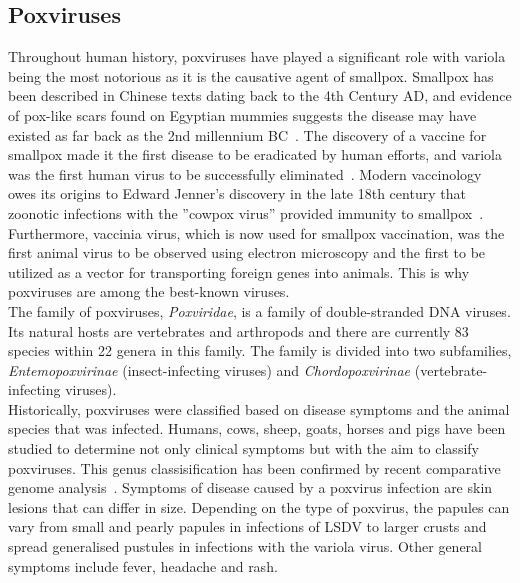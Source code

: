 \subsection{Poxviruses}
Throughout human history, poxviruses have played a significant role with variola being the most notorious as it is the causative agent of smallpox. Smallpox has been described in Chinese texts dating back to the 4th Century AD, and evidence of pox-like scars found on Egyptian mummies suggests the disease may have existed as far back as the 2nd millennium BC~\cite{fenner1988history}. The discovery of a vaccine for smallpox made it the first disease to be eradicated by human efforts, and variola was the first human virus to be successfully eliminated~\cite{fenner2000adventures}. Modern vaccinology owes its origins to Edward Jenner's discovery in the late 18th century that zoonotic infections with the ''cowpox virus'' provided immunity to smallpox~\cite{fenner1988history}. Furthermore, vaccinia virus, which is now used for smallpox vaccination, was the first animal virus to be observed using electron microscopy and the first to be utilized as a vector for transporting foreign genes into animals. This is why poxviruses are among the best-known viruses. \\
The family of poxviruses, \textit{Poxviridae}, is a family of double-stranded \ac{DNA} viruses. Its natural hosts are vertebrates and arthropods and there are currently 83 species within 22 genera in this family. The family is divided into two subfamilies, \textit{Entemopoxvirinae} (insect-infecting viruses) and \textit{Chordopoxvirinae} (vertebrate-infecting viruses). \\
Historically, poxviruses were classified based on disease symptoms and the animal species that was infected. Humans, cows, sheep, goats, horses and pigs have been studied to determine not only clinical symptoms but with the aim to classify poxviruses. This genus classisification has been confirmed by recent comparative genome analysis~\cite{gubser2004poxvirus}. Symptoms of disease caused by a poxvirus infection are skin lesions that can differ in size. Depending on the type of poxvirus, the papules can vary from small and pearly papules in infections of \ac{LSDV} to larger crusts and spread generalised pustules in infections with the variola virus. Other general symptoms include fever, headache and rash.

